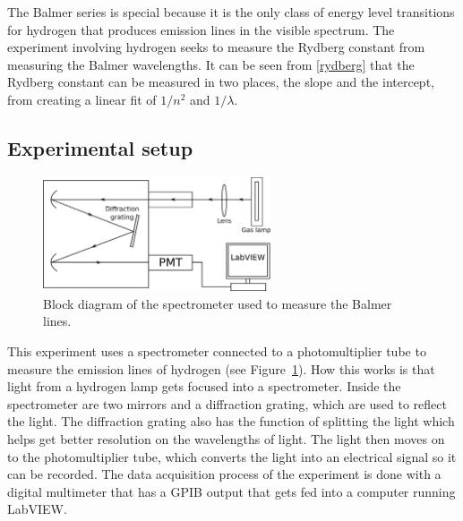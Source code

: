 \documentclass[11pt,letterpaper]{article}
\begin{document}
The Balmer series is special because it is the only class of energy level
transitions for hydrogen that produces emission lines in the visible spectrum. 
The experiment involving hydrogen seeks to measure the Rydberg constant from
measuring the Balmer wavelengths. It can be seen from \eqref{rydberg} that the
Rydberg constant can be measured in two places, the slope and the intercept, 
from creating a linear fit of $1 / n^2$ and $1 / \lambda$.

\subsection{Experimental setup}

\begin{figure}
    \centering
    \includegraphics[width=0.6\textwidth]{figures/spectrometer.png}
    \caption{Block diagram of the spectrometer used to measure the Balmer
        lines.}
    \label{spectrometer}
\end{figure}

This experiment uses a spectrometer connected to a photomultiplier tube to
measure the emission lines of hydrogen (see Figure~\ref{spectrometer}). How this
works is that light from a hydrogen lamp gets focused into a spectrometer.
Inside the spectrometer are two mirrors and a diffraction grating, which are
used to reflect the light. The diffraction grating also has the function of
splitting the light which helps get better resolution on the wavelengths of
light. The light then moves on to the photomultiplier tube, which converts the
light into an electrical signal so it can be recorded. The data acquisition
process of the experiment is done with a digital multimeter that has a GPIB
output that gets fed into a computer running LabVIEW.\\
\end{document}
